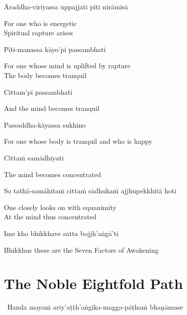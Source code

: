 Āraddha-vīriyassa uppajjati pīti nirāmisā

\begin{english}
  For one who is energetic\\
  Spiritual rapture arises
\end{english}

Pīti-manassa kāyo'pi passambhati

\begin{english}
  For one whose mind is uplifted by rapture\\
  The body becomes tranquil
\end{english}

Cittam'pi passambhati

\begin{english}
  And the mind becomes tranquil
\end{english}

Passaddha-kāyassa sukhino

\begin{english}
  For one whose body is tranquil and who is happy
\end{english}

Cittaṁ samādhiyati

\begin{english}
  The mind becomes concentrated
\end{english}

So tathā-samāhitaṁ cittaṁ sādhukaṁ ajjhupekkhitā hoti

\begin{english}
  One closely looks on with equanimity\\
  At the mind thus concentrated
\end{english}

\suttaRef{[SN 46.3]}

Ime kho bhikkhave satta bojjh'aṅgā'ti

\begin{english}
  Bhikkhus these are the Seven Factors of Awakening
\end{english}

\suttaRef{[SN 46.22]}


\section{The Noble Eightfold Path}
\label{noble-eightfold-path}

\begin{leader}
  \anglebracketleft\ \hspace{-0.5mm}Handa mayaṁ ariy'aṭṭh'aṅgika-magga-pāṭhaṁ bhaṇāmase \hspace{-0.5mm}\anglebracketright\
\end{leader}

